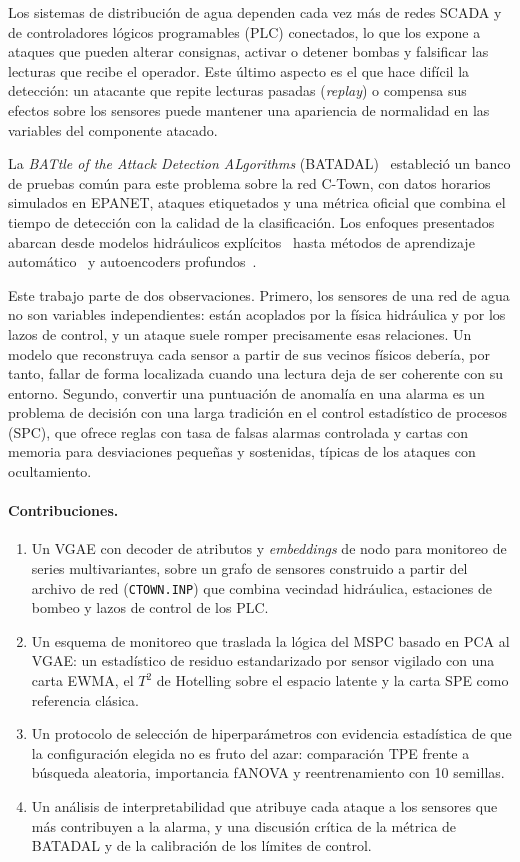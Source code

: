 \documentclass[11pt,a4paper]{article}
\begin{document}
Los sistemas de distribución de agua dependen cada vez más de redes SCADA y de
controladores lógicos programables (PLC) conectados, lo que los expone a ataques
que pueden alterar consignas, activar o detener bombas y falsificar las lecturas que
recibe el operador. Este último aspecto es el que hace difícil la detección: un
atacante que repite lecturas pasadas (\emph{replay}) o compensa sus efectos sobre los
sensores puede mantener una apariencia de normalidad en las variables del
componente atacado.

La \emph{BATtle of the Attack Detection ALgorithms} (BATADAL)~\cite{taormina2018}
estableció un banco de pruebas común para este problema sobre la red C-Town, con
datos horarios simulados en EPANET, ataques etiquetados y una métrica oficial que
combina el tiempo de detección con la calidad de la clasificación. Los enfoques
presentados abarcan desde modelos hidráulicos explícitos~\cite{housh2018} hasta
métodos de aprendizaje automático~\cite{abokifa2019} y autoencoders
profundos~\cite{taormina2018deep}.

Este trabajo parte de dos observaciones. Primero, los sensores de una red de agua
no son variables independientes: están acoplados por la física hidráulica y por los
lazos de control, y un ataque suele romper precisamente esas relaciones. Un modelo
que reconstruya cada sensor a partir de sus vecinos físicos debería, por tanto,
fallar de forma localizada cuando una lectura deja de ser coherente con su entorno.
Segundo, convertir una puntuación de anomalía en una alarma es un problema de
decisión con una larga tradición en el control estadístico de procesos (SPC), que
ofrece reglas con tasa de falsas alarmas controlada y cartas con memoria para
desviaciones pequeñas y sostenidas, típicas de los ataques con ocultamiento.

\paragraph{Contribuciones.}
\begin{enumerate}[leftmargin=*]
\item Un VGAE con decoder de atributos y \emph{embeddings} de nodo para monitoreo de
  series multivariantes, sobre un grafo de sensores construido a partir del archivo
  de red (\texttt{CTOWN.INP}) que combina vecindad hidráulica, estaciones de bombeo y
  lazos de control de los PLC.
\item Un esquema de monitoreo que traslada la lógica del MSPC basado en PCA al VGAE:
  un estadístico de residuo estandarizado por sensor vigilado con una carta EWMA, el
  $T^2$ de Hotelling sobre el espacio latente y la carta SPE como referencia clásica.
\item Un protocolo de selección de hiperparámetros con evidencia estadística de que
  la configuración elegida no es fruto del azar: comparación TPE frente a búsqueda
  aleatoria, importancia fANOVA y reentrenamiento con 10 semillas.
\item Un análisis de interpretabilidad que atribuye cada ataque a los sensores que
  más contribuyen a la alarma, y una discusión crítica de la métrica de BATADAL y de
  la calibración de los límites de control.
\end{enumerate}
\end{document}
